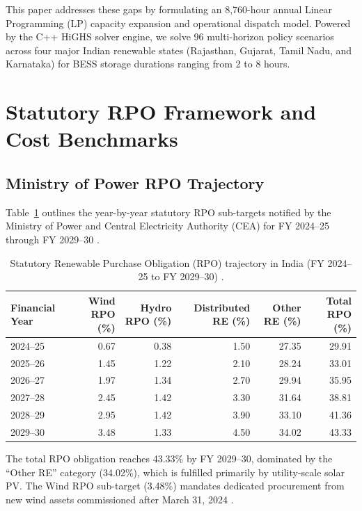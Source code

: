 \documentclass[11pt,a4paper]{article}
\begin{document}
This paper addresses these gaps by formulating an 8,760-hour annual Linear Programming (LP) capacity expansion and operational dispatch model. Powered by the C++ HiGHS solver engine, we solve 96 multi-horizon policy scenarios across four major Indian renewable states (Rajasthan, Gujarat, Tamil Nadu, and Karnataka) for BESS storage durations ranging from 2 to 8 hours.

\section{Statutory RPO Framework and Cost Benchmarks}
\label{sec:framework}

\subsection{Ministry of Power RPO Trajectory}
\label{sec:trajectory}

Table~\ref{tab:rpo_targets} outlines the year-by-year statutory RPO sub-targets notified by the Ministry of Power and Central Electricity Authority (CEA) for FY 2024--25 through FY 2029--30 \cite{CEA2023, Singh2024}.

\begin{table}[htbp]
\centering
\small
\caption{Statutory Renewable Purchase Obligation (RPO) trajectory in India (FY 2024--25 to FY 2029--30) \cite{CEA2023, Singh2024}.}
\label{tab:rpo_targets}
\begin{tabular}{lrrrrr}
\toprule
Financial Year & Wind RPO (\%) & Hydro RPO (\%) & Distributed RE (\%) & Other RE (\%) & Total RPO (\%) \\
\midrule
2024--25 & 0.67 & 0.38 & 1.50 & 27.35 & 29.91 \\
2025--26 & 1.45 & 1.22 & 2.10 & 28.24 & 33.01 \\
2026--27 & 1.97 & 1.34 & 2.70 & 29.94 & 35.95 \\
2027--28 & 2.45 & 1.42 & 3.30 & 31.64 & 38.81 \\
2028--29 & 2.95 & 1.42 & 3.90 & 33.10 & 41.36 \\
2029--30 & 3.48 & 1.33 & 4.50 & 34.02 & 43.33 \\
\bottomrule
\end{tabular}
\end{table}

The total RPO obligation reaches 43.33\% by FY 2029--30, dominated by the ``Other RE'' category (34.02\%), which is fulfilled primarily by utility-scale solar PV. The Wind RPO sub-target (3.48\%) mandates dedicated procurement from new wind assets commissioned after March 31, 2024 \cite{Takyar2024}.
\end{document}
